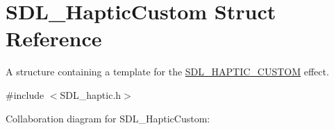 \hypertarget{struct_s_d_l___haptic_custom}{}\section{S\+D\+L\+\_\+\+Haptic\+Custom Struct Reference}
\label{struct_s_d_l___haptic_custom}


A structure containing a template for the \hyperlink{_s_d_l__haptic_8h_a8a18c4de1076ac9bebd718329d16db29}{S\+D\+L\+\_\+\+H\+A\+P\+T\+I\+C\+\_\+\+C\+U\+S\+T\+O\+M} effect.  




{\ttfamily \#include $<$S\+D\+L\+\_\+haptic.\+h$>$}



Collaboration diagram for S\+D\+L\+\_\+\+Haptic\+Custom\+:
